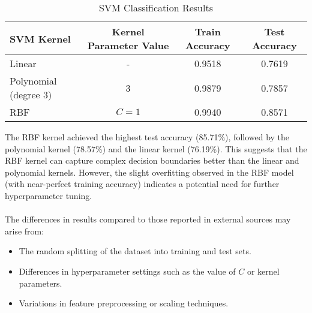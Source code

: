 \documentclass[a4paper, 11pt]{article}
\begin{document}
	\begin{table}[H]
		\centering
		\begin{tabular}{@{}lccc@{}}
			\toprule
			\textbf{SVM Kernel} & \textbf{Kernel Parameter Value} & \textbf{Train Accuracy} & \textbf{Test Accuracy} \\
			\midrule
			Linear             & -                               & 0.9518                  & 0.7619                  \\
			Polynomial (degree 3) & 3                            & 0.9879                  & 0.7857                  \\
			RBF                & \(C=1\)                         & 0.9940                  & 0.8571                  \\
			\bottomrule
		\end{tabular}
		\caption{SVM Classification Results}
	\end{table}
	

	The RBF kernel achieved the highest test accuracy (85.71\%), followed by the polynomial kernel (78.57\%) and the linear kernel (76.19\%). This suggests that the RBF kernel can capture complex decision boundaries better than the linear and polynomial kernels. However, the slight overfitting observed in the RBF model (with near-perfect training accuracy) indicates a potential need for further hyperparameter tuning.
	\\\\
	The differences in results compared to those reported in external sources may arise from:
	\begin{itemize}
		\item The random splitting of the dataset into training and test sets.
		\item Differences in hyperparameter settings such as the value of \(C\) or kernel parameters.
		\item Variations in feature preprocessing or scaling techniques.
	\end{itemize}
\end{document}
